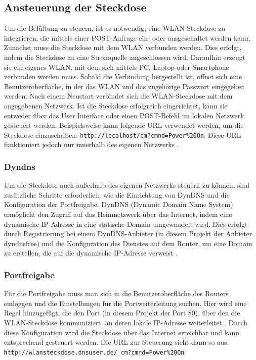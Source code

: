 \documentclass[conference]{IEEEtran}
\begin{document}
\subsection{Ansteuerung der Steckdose}
Um die Belüftung zu steuern, ist es notwendig, eine WLAN-Steckdose zu integrieren, die mittels einer POST-Anfrage ein- oder ausgeschaltet werden kann. Zunächst muss die Steckdose mit dem WLAN verbunden werden. Dies erfolgt, indem die Steckdose an eine Stromquelle angeschlossen wird. Daraufhin erzeugt sie ein eigenes WLAN, mit dem sich mittels PC, Laptop oder Smartphone verbunden werden muss. Sobald die Verbindung hergestellt ist, öffnet sich eine Benutzeroberfläche, in der das WLAN und das zugehörige Passwort eingegeben werden. Nach einem Neustart verbindet sich die WLAN-Steckdose mit dem angegebenen Netzwerk.
Ist die Steckdose erfolgreich eingerichtet, kann sie entweder über das User Interface oder einen POST-Befehl im lokalen Netzwerk gesteuert werden. Beispielsweise kann folgende URL verwendet werden, um die Steckdose einzuschalten: \texttt{http://localhost/cm?cmnd=Power\%20On}. Diese URL funktioniert jedoch nur innerhalb des eigenen Netzwerks \cite{delock}.

\subsubsection{Dyndns}
Um die Steckdose auch außerhalb des eigenen Netzwerks steuern zu können, sind zusätzliche Schritte erforderlich, wie die Einrichtung von DynDNS und die Konfiguration der Portfreigabe. DynDNS (Dynamic Domain Name System) ermöglicht den Zugriff auf das Heimnetzwerk über das Internet, indem eine dynamische IP-Adresse in eine statische Domain umgewandelt wird. Dies erfolgt durch Registrierung bei einem DynDNS-Anbieter (in diesem Projekt der Anbieter dyndnsfree) und die Konfiguration des Dienstes auf dem Router, um eine Domain zu erstellen, die auf die dynamische IP-Adresse verweist \cite{dyndns}.
\subsubsection{Portfreigabe}
Für die Portfreigabe muss man sich in die Benutzeroberfläche des Routers einloggen und die Einstellungen für die Portweiterleitung suchen. Hier wird eine Regel hinzugefügt, die den Port (in diesem Projekt der Port 80), über den die WLAN-Steckdose kommuniziert, an deren lokale IP-Adresse weiterleitet \cite{portfreigabe}. Durch diese Konfiguration wird die Steckdose über das Internet erreichbar und kann entsprechend gesteuert werden. Die URL zur Steuerung sieht dann so aus: \texttt{http://wlansteckdose.dnsuser.de/
cm?cmnd=Power\%20On}
\end{document}
